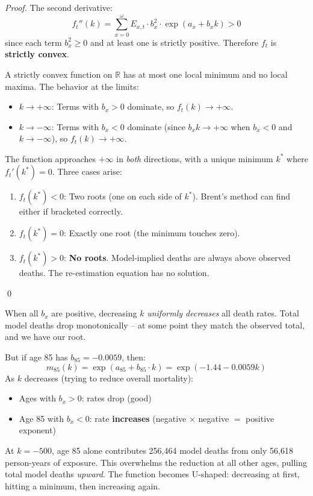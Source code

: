 \documentclass[11pt,a4paper]{article}
\theoremstyle{definition}
\newcommand{\R}{\mathbb{R}}
\begin{document}
\begin{proof}
The second derivative:
\[
  f_t''(k) = \sum_{x=0}^{\omega} E_{x,t} \cdot b_x^2 \cdot \exp(a_x + b_x k) > 0
\]
since each term $b_x^2 \geq 0$ and at least one is strictly positive.
Therefore $f_t$ is \textbf{strictly convex}.

A strictly convex function on $\R$ has at most one local minimum and
no local maxima. The behavior at the limits:
\begin{itemize}
  \item $k \to +\infty$: Terms with $b_x > 0$ dominate, so $f_t(k) \to +\infty$.
  \item $k \to -\infty$: Terms with $b_x < 0$ dominate (since $b_x k \to +\infty$
    when $b_x < 0$ and $k \to -\infty$), so $f_t(k) \to +\infty$.
\end{itemize}

The function approaches $+\infty$ in \emph{both} directions, with a unique
minimum $k^*$ where $f_t'(k^*) = 0$. Three cases arise:
\begin{enumerate}
  \item $f_t(k^*) < 0$: Two roots (one on each side of $k^*$). Brent's method
    can find either if bracketed correctly.
  \item $f_t(k^*) = 0$: Exactly one root (the minimum touches zero).
  \item $f_t(k^*) > 0$: \textbf{No roots}. Model-implied deaths are always
    above observed deaths. The re-estimation equation has no solution.
\end{enumerate}
\qed
\end{proof}

\begin{intuition}
When all $b_x$ are positive, decreasing $k$ \emph{uniformly decreases}
all death rates. Total model deaths drop monotonically -- at some point
they match the observed total, and we have our root.

But if age 85 has $b_{85} = -0.0059$, then:
\[
  m_{85}(k) = \exp(a_{85} + b_{85} \cdot k) = \exp(-1.44 - 0.0059k)
\]
As $k$ decreases (trying to reduce overall mortality):
\begin{itemize}
  \item Ages with $b_x > 0$: rates drop (good)
  \item Age 85 with $b_x < 0$: rate \textbf{increases} (negative $\times$ negative $=$ positive exponent)
\end{itemize}

At $k = -500$, age 85 alone contributes 256{,}464 model deaths from
only 56{,}618 person-years of exposure. This overwhelms the reduction
at all other ages, pulling total model deaths \emph{upward}. The
function becomes U-shaped: decreasing at first, hitting a minimum,
then increasing again.
\end{intuition}
\end{document}
